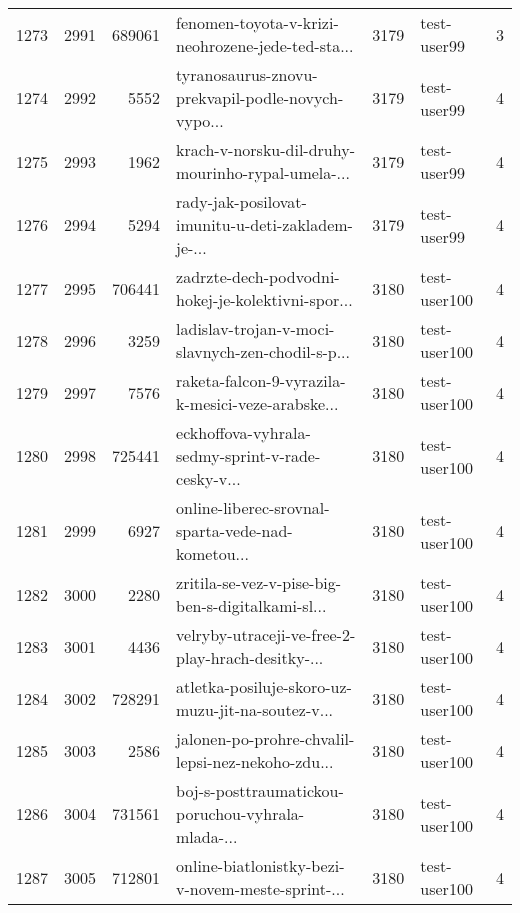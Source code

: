 \begin{tabular}{lrrlrlr}
1273 &       2991 &   689061 &  fenomen-toyota-v-krizi-neohrozene-jede-ted-sta... &     3179 &                  test-user99 &               3 \\
1274 &       2992 &     5552 &  tyranosaurus-znovu-prekvapil-podle-novych-vypo... &     3179 &                  test-user99 &               4 \\
1275 &       2993 &     1962 &  krach-v-norsku-dil-druhy-mourinho-rypal-umela-... &     3179 &                  test-user99 &               4 \\
1276 &       2994 &     5294 &  rady-jak-posilovat-imunitu-u-deti-zakladem-je-... &     3179 &                  test-user99 &               4 \\
1277 &       2995 &   706441 &  zadrzte-dech-podvodni-hokej-je-kolektivni-spor... &     3180 &                 test-user100 &               4 \\
1278 &       2996 &     3259 &  ladislav-trojan-v-moci-slavnych-zen-chodil-s-p... &     3180 &                 test-user100 &               4 \\
1279 &       2997 &     7576 &  raketa-falcon-9-vyrazila-k-mesici-veze-arabske... &     3180 &                 test-user100 &               4 \\
1280 &       2998 &   725441 &  eckhoffova-vyhrala-sedmy-sprint-v-rade-cesky-v... &     3180 &                 test-user100 &               4 \\
1281 &       2999 &     6927 &  online-liberec-srovnal-sparta-vede-nad-kometou... &     3180 &                 test-user100 &               4 \\
1282 &       3000 &     2280 &  zritila-se-vez-v-pise-big-ben-s-digitalkami-sl... &     3180 &                 test-user100 &               4 \\
1283 &       3001 &     4436 &  velryby-utraceji-ve-free-2-play-hrach-desitky-... &     3180 &                 test-user100 &               4 \\
1284 &       3002 &   728291 &  atletka-posiluje-skoro-uz-muzu-jit-na-soutez-v... &     3180 &                 test-user100 &               4 \\
1285 &       3003 &     2586 &  jalonen-po-prohre-chvalil-lepsi-nez-nekoho-zdu... &     3180 &                 test-user100 &               4 \\
1286 &       3004 &   731561 &  boj-s-posttraumatickou-poruchou-vyhrala-mlada-... &     3180 &                 test-user100 &               4 \\
1287 &       3005 &   712801 &  online-biatlonistky-bezi-v-novem-meste-sprint-... &     3180 &                 test-user100 &               4 \\

\end{tabular}
